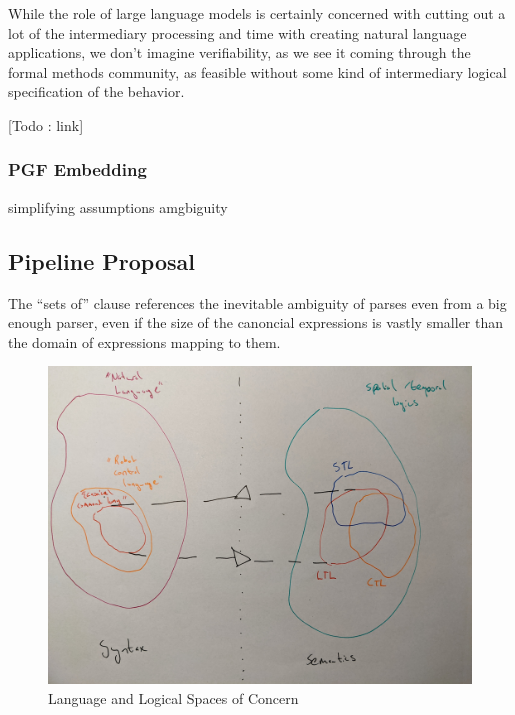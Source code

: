 \documentclass[a4paper, 11pt]{article}
\begin{document}
While the role of large language models is certainly concerned with cutting out
a lot of the intermediary processing and time with creating natural language
applications, we don't imagine verifiability, as we see it coming through the
formal methods community, as feasible without some kind of intermediary logical
specification of the behavior. 




[Todo : link]




\subsubsection{PGF Embedding}

simplifying assumptions
amgbiguity

\subsection{Pipeline Proposal}

The ``sets of'' clause
references the inevitable ambiguity of parses even from a big enough parser, even
if the size of the canoncial expressions is vastly smaller than the domain of
expressions mapping to them.

\begin{figure}[H]
\centering
\includegraphics[width=150mm]{pics/one.jpg}
\caption{Language and Logical Spaces of Concern} \label{fig:M1}
\end{figure}
\end{document}
